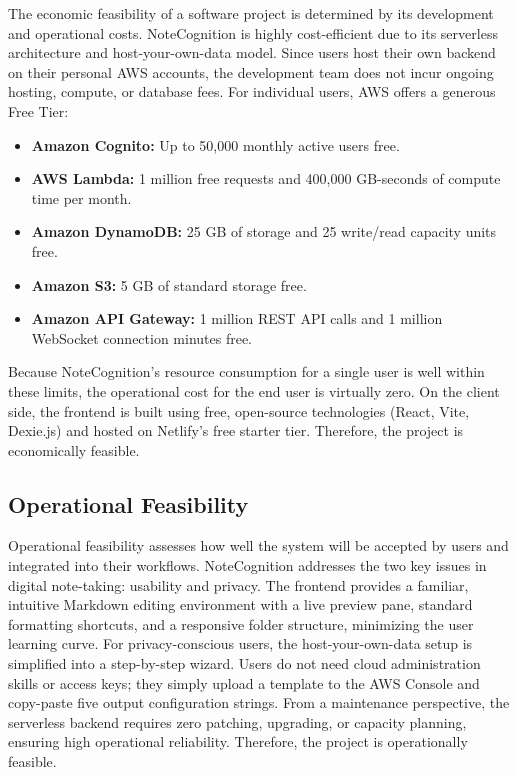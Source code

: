 \documentclass[12pt, a4paper, oneside]{report}
\begin{document}
The economic feasibility of a software project is determined by its development and operational costs. NoteCognition is highly cost-efficient due to its serverless architecture and host-your-own-data model. Since users host their own backend on their personal AWS accounts, the development team does not incur ongoing hosting, compute, or database fees. For individual users, AWS offers a generous Free Tier:
\begin{itemize}[noitemsep]
    \item \textbf{Amazon Cognito:} Up to 50,000 monthly active users free.
    \item \textbf{AWS Lambda:} 1 million free requests and 400,000 GB-seconds of compute time per month.
    \item \textbf{Amazon DynamoDB:} 25 GB of storage and 25 write/read capacity units free.
    \item \textbf{Amazon S3:} 5 GB of standard storage free.
    \item \textbf{Amazon API Gateway:} 1 million REST API calls and 1 million WebSocket connection minutes free.
\end{itemize}
Because NoteCognition's resource consumption for a single user is well within these limits, the operational cost for the end user is virtually zero. On the client side, the frontend is built using free, open-source technologies (React, Vite, Dexie.js) and hosted on Netlify's free starter tier. Therefore, the project is economically feasible.

\subsection{Operational Feasibility}

Operational feasibility assesses how well the system will be accepted by users and integrated into their workflows. NoteCognition addresses the two key issues in digital note-taking: usability and privacy. The frontend provides a familiar, intuitive Markdown editing environment with a live preview pane, standard formatting shortcuts, and a responsive folder structure, minimizing the user learning curve. For privacy-conscious users, the host-your-own-data setup is simplified into a step-by-step wizard. Users do not need cloud administration skills or access keys; they simply upload a template to the AWS Console and copy-paste five output configuration strings. From a maintenance perspective, the serverless backend requires zero patching, upgrading, or capacity planning, ensuring high operational reliability. Therefore, the project is operationally feasible.
\end{document}
